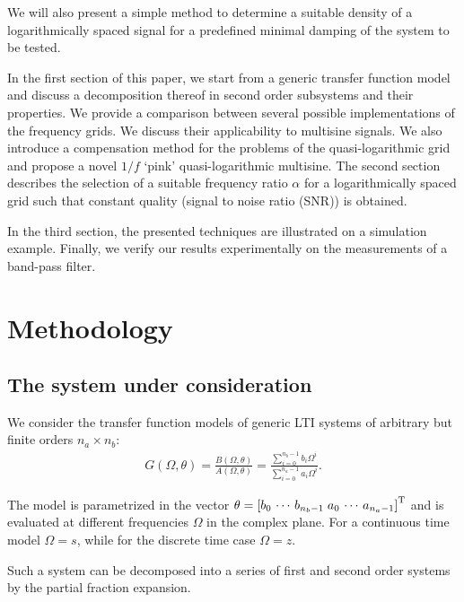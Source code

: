   We will also present a simple method to determine a suitable density of a logarithmically spaced signal for a predefined minimal damping of the system to be tested.

  In the first section of this paper, we start from a generic transfer function model and discuss a decomposition thereof in second order subsystems and their properties.
  We provide a comparison between several possible implementations of the frequency grids.
  We discuss their applicability to multisine signals.
  We also introduce a compensation method for the problems of the quasi-logarithmic grid and propose a novel $1/f$ `pink' quasi-logarithmic multisine.
  The second section describes the selection of a suitable frequency ratio $\alpha$ for a logarithmically spaced grid such that constant quality (signal to noise ratio (SNR)) is obtained.

  In the third section, the presented techniques are illustrated on a simulation example.
  Finally, we verify our results experimentally on the measurements of a band-pass filter.

\section{Methodology} \label{sec:method}

  \subsection{The system under consideration}
  We consider the transfer function models of generic \gls{LTI} systems of arbitrary but finite orders $n_a\times n_b$:
  \begin{align}
    G\left( \Omega, \theta \right) = \frac{B\left( \Omega,\theta \right)}
                                          {A\left( \Omega,\theta \right)}
                                   = \frac{\sum\limits_{i=0}^{n_b-1} b_i \Omega^i}
                                          {\sum\limits_{i=0}^{n_a-1} a_i \Omega^i}
    \text{.} \label{eq:model}
  \end{align}
  
  The model is parametrized in the vector $\theta = \left[b_0 \,\cdots\, b_{n_b-1} \; a_0 \,\cdots\, a_{n_a-1} \right]^{\mathrm{T}}$ and  is evaluated at different frequencies $\Omega$ in the complex plane.
  For a continuous time model $\Omega = s$, while for the discrete time case $\Omega = z$.

  Such a system can be decomposed into a series of first and second order systems by the partial fraction expansion.

